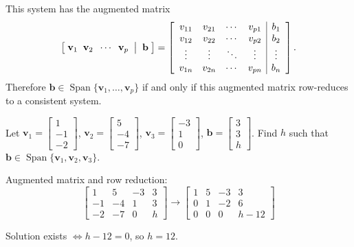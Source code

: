 This system has the augmented matrix
\[
  \left[\; \mathbf{v}_1 \;\; \mathbf{v}_2 \;\; \cdots \;\; \mathbf{v}_p \;\bigm|\; \mathbf{b} \;\right]
  =
  \left[
    \begin{array}{cccc|c}
      v_{11} & v_{21} & \cdots & v_{p1} & b_1    \\
      v_{12} & v_{22} & \cdots & v_{p2} & b_2    \\
      \vdots & \vdots & \ddots & \vdots & \vdots \\
      v_{1n} & v_{2n} & \cdots & v_{pn} & b_n
    \end{array}
    \right].
\]
Therefore $\mathbf{b} \in \operatorname{Span}\{\mathbf{v}_1, \ldots, \mathbf{v}_p\}$ if and only if this augmented matrix row-reduces to a consistent system.

\begin{example}
  Let $\mathbf{v}_1 =
    \begin{bmatrix}
      1 \\ -1 \\ -2
    \end{bmatrix}
  $,
  $\mathbf{v}_2 =
    \begin{bmatrix}
      5 \\ -4 \\ -7
    \end{bmatrix}
  $,
  $\mathbf{v}_3 =
    \begin{bmatrix}
      -3 \\ 1 \\ 0
    \end{bmatrix}
  $,
  $\mathbf{b} =
    \begin{bmatrix}
      3 \\ 3 \\ h
    \end{bmatrix}
  $.
  Find $h$ such that $\mathbf{b} \in \operatorname{Span}\{\mathbf{v}_1, \mathbf{v}_2, \mathbf{v}_3\}$.

  Augmented matrix and row reduction:
  \[
    \left[
      \begin{array}{ccc|c}
        1  & 5  & -3 & 3 \\
        -1 & -4 & 1  & 3 \\
        -2 & -7 & 0  & h
      \end{array}
      \right]
    \longrightarrow
    \left[
      \begin{array}{ccc|c}
        1 & 5 & -3 & 3      \\
        0 & 1 & -2 & 6      \\
        0 & 0 & 0  & h - 12
      \end{array}
      \right]
  \]

  Solution exists $\iff h - 12 = 0$, so $h = 12$.
\end{example}

